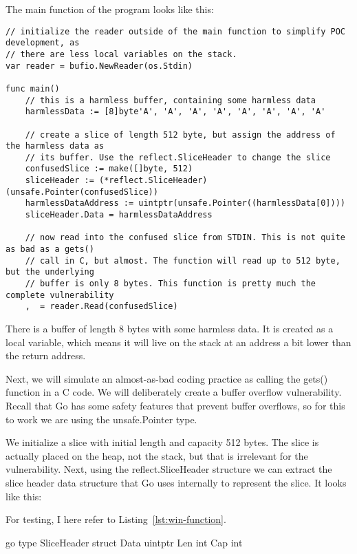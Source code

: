 The main function of the program looks like this:

\begin{lstlisting}[language=Golang, label=lst:redirection-poc-1, caption=Code flow redirection POC first part]
// initialize the reader outside of the main function to simplify POC development, as
// there are less local variables on the stack.
var reader = bufio.NewReader(os.Stdin)

func main() 
    // this is a harmless buffer, containing some harmless data
    harmlessData := [8]byte'A', 'A', 'A', 'A', 'A', 'A', 'A', 'A'

    // create a slice of length 512 byte, but assign the address of the harmless data as
    // its buffer. Use the reflect.SliceHeader to change the slice
    confusedSlice := make([]byte, 512)
    sliceHeader := (*reflect.SliceHeader)(unsafe.Pointer(confusedSlice))
    harmlessDataAddress := uintptr(unsafe.Pointer((harmlessData[0])))
    sliceHeader.Data = harmlessDataAddress

    // now read into the confused slice from STDIN. This is not quite as bad as a gets()
    // call in C, but almost. The function will read up to 512 byte, but the underlying
    // buffer is only 8 bytes. This function is pretty much the complete vulnerability
    ,  = reader.Read(confusedSlice)
\end{lstlisting}


There is a buffer of length 8 bytes with some harmless data. It is created as a local variable, which means it will live
on the stack at an address a bit lower than the return address.

Next, we will simulate an almost-as-bad coding practice as calling the gets() function in a C code. We will
deliberately create a buffer overflow vulnerability. Recall that Go has some safety features that prevent buffer
overflows, so for this to work we are using the unsafe.Pointer type.

We initialize a slice with initial length and capacity 512 bytes. The slice is actually placed on the heap, not the
stack, but that is irrelevant for the vulnerability. Next, using the reflect.SliceHeader structure we can extract
the slice header data structure that Go uses internally to represent the slice. It looks like this:

For testing, I here refer to Listing~\ref{lst:win-function}.

go
type SliceHeader struct 
	Data uintptr
	Len  int
	Cap  int




